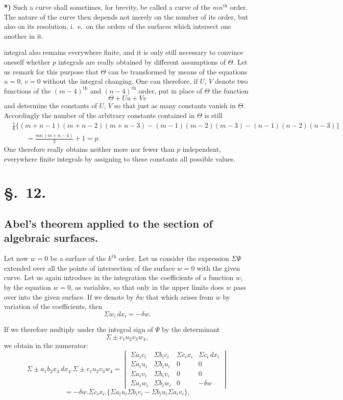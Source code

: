\documentclass{article}
\begin{document}
\textbf{*)} Such a curve shall sometimes, for brevity, be called a curve of the $mn^{\text{th}}$ order. The nature of the curve then depends not merely on the number of its order, but also on its resolution, i.\ e.\ on the orders of the surfaces which intersect one another in it.


integral also remains everywhere finite, and it is only still necessary to convince oneself whether $p$ integrals are really obtained by different assumptions of $\Theta$. Let us remark for this purpose that $\Theta$ can be transformed by means of the equations $u=0$, $v=0$ without the integral changing. One can therefore, if $U$, $V$ denote two functions of the $(m-4)^{\text{th}}$ and $(n-4)^{\text{th}}$ order, put in place of $\Theta$ the function
\[
\Theta+Uu+Vv
\]
and determine the constants of $U$, $V$ so that just as many constants vanish in $\Theta$. Accordingly the number of the arbitrary constants contained in $\Theta$ is still
\[
\begin{aligned}
&\tfrac{1}{6}\{(m+n-1)(m+n-2)(m+n-3)-(m-1)(m-2)(m-3)-(n-1)(n-2)(n-3)\}\\
&\qquad = \frac{mn\,(m+n-4)}{2}+1 = p.
\end{aligned}
\]
One therefore really obtains neither more nor fewer than $p$ independent, everywhere finite integrals by assigning to these constants all possible values.

\section*{§.~12.}

\subsection*{Abel's theorem applied to the section of algebraic surfaces.}

Let now $w=0$ be a surface of the $k^{\text{th}}$ order. Let us consider the expression $\Sigma\Psi$ extended over all the points of intersection of the surface $w=0$ with the given curve. Let us again introduce in the integration the coefficients of a function $w$, by the equation $w=0$, as variables, so that only in the upper limits does $w$ pass over into the given surface. If we denote by $\delta w$ that which arises from $w$ by variation of the coefficients, then
\[
\Sigma w_{i}\,dx_{i} = -\delta w.
\]

If we therefore multiply under the integral sign of $\Psi$ by the determinant
\[
\Sigma \pm c_{1} u_{2} v_{3} w_{4},
\]
we obtain in the numerator:
\[
\Sigma \pm a_{1} b_{2} x_{3}\,dx_{4}.\Sigma \pm c_{1} u_{2} v_{3} w_{4} =
\begin{vmatrix}
\Sigma a_{i} c_{i} & \Sigma b_{i} c_{i} & \Sigma c_{i} x_{i} & \Sigma c_{i}\,dx_{i}\\
\Sigma a_{i} u_{i} & \Sigma b_{i} u_{i} & 0 & 0\\
\Sigma a_{i} v_{i} & \Sigma b_{i} v_{i} & 0 & 0\\
\Sigma a_{i} w_{i} & \Sigma b_{i} w_{i} & 0 & -\delta w
\end{vmatrix}
\]
\[
= -\delta w.\Sigma c_{i} x_{i}.\{\Sigma a_{i} u_{i} \Sigma b_{i} v_{i} - \Sigma b_{i} u_{i} \Sigma a_{i} v_{i}\},
\]
\end{document}
